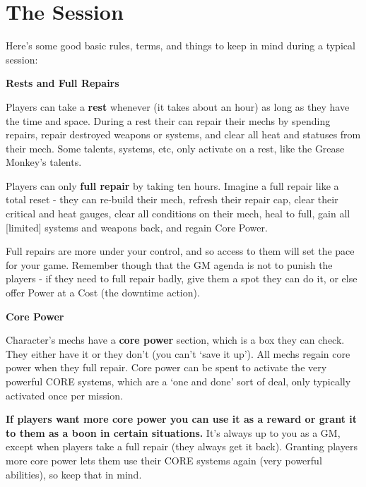 \section{The Session}

Here’s some good basic rules, terms, and things to keep in mind during a typical session:

\begin{center}
     \textbf{Rests and Full Repairs}
\end{center}

Players can take a \textbf{rest} whenever (it takes about an hour) as long as they have the time and
space. During a rest their can repair their mechs by spending repairs, repair destroyed weapons
or systems, and clear all heat and statuses from their mech. Some talents, systems, etc, only
activate on a rest, like the Grease Monkey’s talents.

Players can only \textbf{full repair} by taking ten hours. Imagine a full repair like a total reset - they can
re-build their mech, refresh their repair cap, clear their critical and heat gauges, clear all
conditions on their mech, heal to full, gain all [limited] systems and weapons back, and regain
Core Power.

Full repairs are more under your control, and so access to them will set the pace for your game.
Remember though that the GM agenda is not to punish the players - if they need to full repair
badly, give them a spot they can do it, or else offer Power at a Cost (the downtime action).

\begin{center}
     \textbf{Core Power}
\end{center}                                               

Character’s mechs have a \textbf{core power} section, which is a box they can check. They either have
it or they don’t (you can’t ‘save it up’). All mechs regain core power when they full repair. Core
power can be spent to activate the very powerful CORE systems, which are a ‘one and done’
sort of deal, only typically activated once per mission.

\textbf{If players want more core power you can use it as a reward or grant it to them as a boon in
certain situations.} It’s always up to you as a GM, except when players take a full repair (they
always get it back). Granting players more core power lets them use their CORE systems again
(very powerful abilities), so keep that in mind.
                                    
